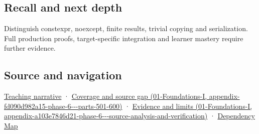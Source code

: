 \subsection{Recall and next depth}\label{appendix-37a39984ba66-recall-and-next-depth}

Distinguish constexpr, noexcept, finite results, trivial copying and serialization. Full production proofs, target-specific integration and learner mastery require further evidence.

\subsection{Source and navigation}\label{appendix-37a39984ba66-source-and-navigation}

\hyperref[02-foundations-ii-ch037-three-stored-numbers-are-not-the-complete-contract]{Teaching narrative} · \href{../01-Foundations-I/main.pdf\#nameddest=appendix-fd090d982a15-phase-6---parts-501-600}{Coverage and source gap (01-Foundations-I, appendix-fd090d982a15-phase-6-\/-\/-parts-501-600)} · \href{../01-Foundations-I/main.pdf\#nameddest=appendix-a103e7846d21-phase-6---source-analysis-and-verification}{Evidence and limits (01-Foundations-I, appendix-a103e7846d21-phase-6-\/-\/-source-analysis-and-verification)} · \hyperref[appendix-4ad47bdd269a]{Dependency Map}
